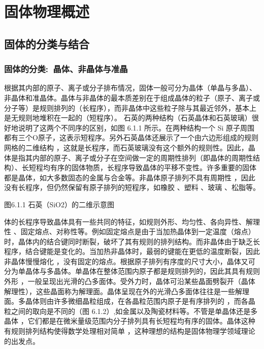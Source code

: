 \setcounter{chapter}{7}
\chapter{固体物理概述}\label{chap:Solid-state_introduct}
\section{固体的分类与结合}

\subsection{固体的分类:~晶体、非晶体与准晶}

根据其内部的原子、离子或分子排布情况，固体一般可分为晶体（单晶与多晶）、非晶体和准晶体。晶体与非晶体的最本质差别在于组成晶体的粒子（原子、离子或分子等）是规则排列的（长程序），而非晶体中这些粒子除与其最近邻外，基本上是无规则地堆积在一起的（短程序）。 石英的两种结构（石英晶体和石英玻璃）很好地说明了这两个不同序的区别，如图 6.1.1 所示。在两种结构一个 Si 原子周围都有三个O原子，这表示短程序。另外石英晶体还展示了一个由六边形组成的规则网格的二维结构 ，这就是长程序，而石英玻璃没有这个额外的规则性。因此，晶体是指其内部的原子、离子或分子在空间做一定的周期性排列（即晶体的周期性结构）、长短程均有序的固体物质，长程序导致晶体的平移不变性。许多重要的固体都是晶体，如大多数固态的金属与合金等。非晶体原子排列不具有周期性 ，因此没有长程序，但仍然保留有原子排列的短程序，如橡胶 、塑料 、玻璃 、松脂等。



图6.1.1 石英（SiO2）的二维示意图

体的长程序导致晶体具有一些共同的特征，如规则外形、均匀性、各向异性、解理性 、固定熔点、对称性等。例如固定熔点是由于当加热晶体到一定温度（熔点）时，晶体内的结合键同时断裂，破坏了其有规则的排列结构。而非晶体由于缺乏长程序，结合键能是变化的。当加热非晶体时，最弱的键能在更低的温度断裂，因此非晶体慢慢熔化 ，没有固定的熔点。根据原子排列有序度的尺寸大小，晶体又可分为单晶体与多晶体。单晶体在整体范围内原子都是规则排列的，因此其具有规则外形 ，一般呈现出光滑的凸多面体。受外力时，晶体可沿某些晶面劈裂开（晶体解理性），这些晶面称为解理面。晶体呈现在外的光滑凸多面体往往是一些解理面。多晶体则由许多微细晶粒组成，在各晶粒范围内原子是有序排列的 ，而各晶粒之间的取向是不同的（图 6.1.2）,如金属以及陶瓷材料等。不管是单晶体还是多晶体 ，它们都是在微米量级范围内分子排列具有长短程均有序的固体。晶体这种有规则排列结构使得数学处理相对简单 ，这种理想的结构是固体物理学领域理论的出发点。



